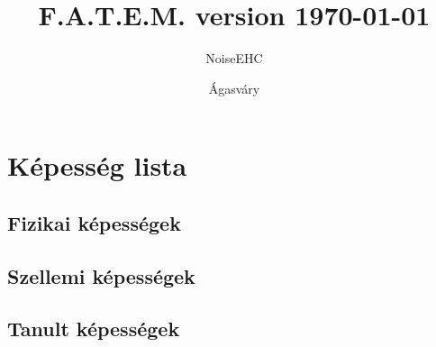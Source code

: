 


\author{NoiseEHC \and Ágasváry}
\title{F.A.T.E.M. version \today}





\pagestyle{empty}


\clearpage

\setmainfont[Ligatures=TeX,Scale=1.4]{EB Garamond}

\tableofcontents 

\pagestyle{fancy}
\renewcommand{\chaptermark}[1]{\markboth{#1}{}}
\setmainfont[Ligatures=TeX,Scale=1.4]{EB Garamond}


\clearpage

\clearpage

\clearpage


\clearpage

\clearpage

\clearpage


\clearpage

\clearpage

\clearpage

\chapter{Képesség lista}
\section{Fizikai képességek}

\clearpage

\clearpage

\clearpage

\clearpage

\clearpage

\clearpage
\section{Szellemi képességek}

\clearpage

\clearpage

\clearpage

\clearpage
\section{Tanult képességek}
\clearpage

